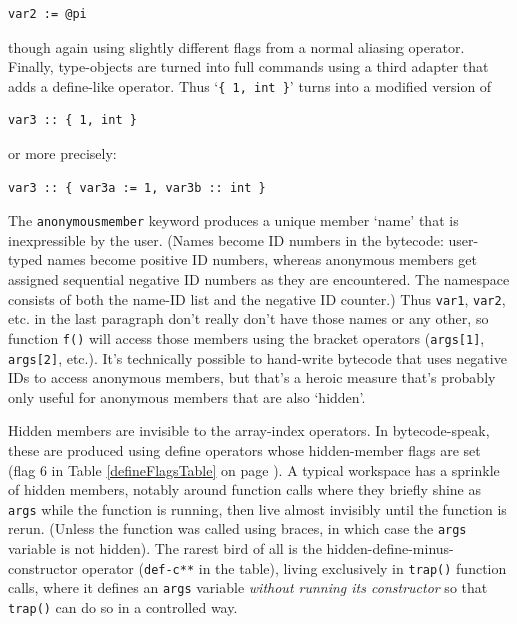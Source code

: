 \documentclass{article}
\newenvironment{code}{
       \begin{list}{}{
               \setlength{\leftmargin}{.4in}
               \setlength{\rightmargin}{0in}
               \setlength{\topsep}{.2in}
       }
       \small
       \item[] }
       { \end{list}   }
\begin{document}
\begin{code} \begin{verbatim}
var2 := @pi
\end{verbatim} \end{code}

\noindent though again using slightly different flags from a normal aliasing operator.  Finally, type-objects are turned into full commands using a third adapter that adds a define-like operator.  Thus `\verb#{ 1, int }#' turns into a modified version of

\begin{code} \begin{verbatim}
var3 :: { 1, int }
\end{verbatim} \end{code}

\noindent or more precisely:

\begin{code} \begin{verbatim}
var3 :: { var3a := 1, var3b :: int }
\end{verbatim} \end{code}

The \verb#anonymousmember# keyword produces a unique member `name' that is inexpressible by the user.  (Names become ID numbers in the bytecode:  user-typed names become positive ID numbers, whereas anonymous members get assigned sequential negative ID numbers as they are encountered.  The namespace consists of both the name-ID list and the negative ID counter.)  Thus \verb#var1#, \verb#var2#, etc. in the last paragraph don't really don't have those names or any other, so function \verb#f()# will access those members using the bracket operators (\verb#args[1]#, \verb#args[2]#, etc.).  It's technically possible to hand-write bytecode that uses negative IDs to access anonymous members, but that's a heroic measure that's probably only useful for anonymous members that are also `hidden'.

Hidden members are invisible to the array-index operators.  In bytecode-speak, these are produced using define operators whose hidden-member flags are set (flag 6 in Table \ref{defineFlagsTable} on page \pageref{defineFlagsTable}).  A typical workspace has a sprinkle of hidden members, notably around function calls where they briefly shine as \verb#args# while the function is running, then live almost invisibly until the function is rerun.  (Unless the function was called using braces, in which case the \verb#args# variable is not hidden).  The rarest bird of all is the hidden-define-minus-constructor operator (\verb#def-c**# in the table), living exclusively in \verb#trap()# function calls, where it defines an \verb#args# variable \emph{without running its constructor} so that \verb#trap()# can do so in a controlled way.
\end{document}
